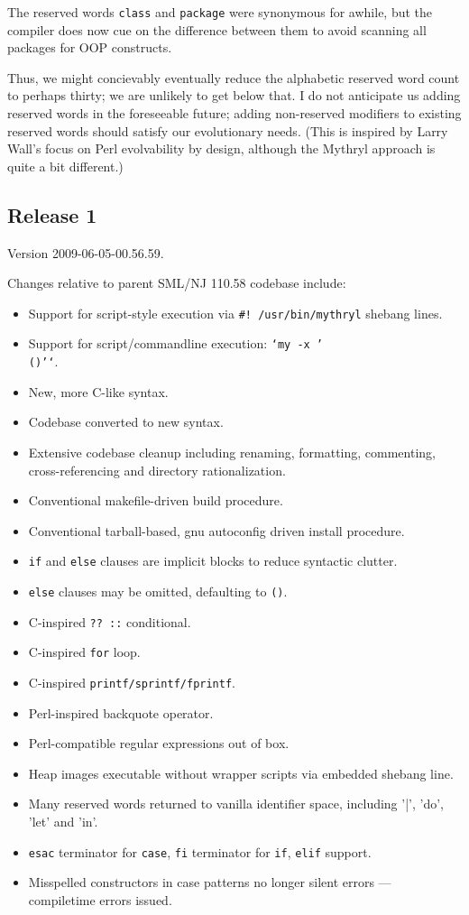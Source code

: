 The reserved words {\tt class} and {\tt package} were synonymous for 
awhile, but the compiler does now cue on the difference between them 
to avoid scanning all packages for OOP constructs.

Thus, we might concievably eventually reduce the alphabetic reserved 
word count to perhaps thirty; we are unlikely to get below that.  I do 
not anticipate us adding reserved words in the foreseeable future; 
adding non-reserved modifiers to existing reserved words should 
satisfy our evolutionary needs.  (This is inspired by Larry Wall's 
focus on Perl evolvability by design, although the Mythryl 
approach is quite a bit different.)

\cutend*


\subsection{Release 1}
\label{section:src:release-1}

Version 2009-06-05-00.56.59.

Changes relative to parent {\sc SML/NJ} 110.58 codebase include:
\begin{itemize}
\item Support for script-style execution via {\tt#! /usr/bin/mythryl} shebang lines.
\item Support for script/commandline execution: {\tt `my -x '\\()'`}.
\item New, more C-like syntax.
\item Codebase converted to new syntax.
\item Extensive codebase cleanup including renaming, formatting, commenting, cross-referencing and directory rationalization.
\item Conventional makefile-driven build procedure.
\item Conventional tarball-based, gnu autoconfig driven install procedure.
\item {\tt if} and {\tt else} clauses are implicit blocks to reduce syntactic clutter.
\item {\tt else} clauses may be omitted, defaulting to {\tt ()}.
\item C-inspired {\tt ?? ::} conditional.
\item C-inspired {\tt for} loop.
\item C-inspired {\tt printf/sprintf/fprintf}.
\item Perl-inspired backquote operator.
\item Perl-compatible regular expressions out of box.
\item Heap images executable without wrapper scripts via embedded shebang line.
\item Many reserved words returned to vanilla identifier space, including '|', 'do', 'let' and 'in'.
\item {\tt esac} terminator for {\tt case}, {\tt fi} terminator for {\tt if}, {\tt elif} support.
\item Misspelled constructors in case patterns no longer silent errors --- compiletime errors issued.
\end{itemize}

\cutend*

